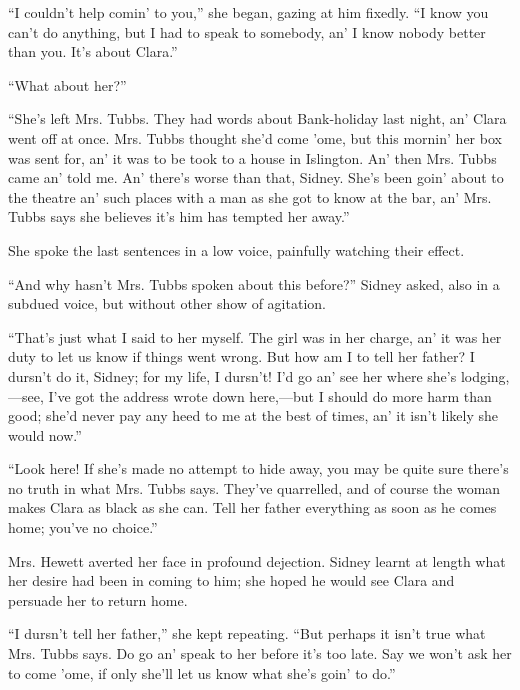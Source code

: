 ``I couldn't help comin' to you,'' she began, gazing at him fixedly. ``I
know you can't do anything, but I had to speak to somebody,
{\protect\hypertarget{220}{}{}}an' I know nobody better than you. It's
about Clara.''

``What about her?''

``She's left Mrs. Tubbs. They had words about Bank-holiday last night,
an' Clara went off at once. Mrs. Tubbs thought she'd come 'ome, but this
mornin' her box was sent for, an' it was to be took to a house in
Islington. An' then Mrs. Tubbs came an' told me. An' there's worse than
that, Sidney. She's been goin' about to the theatre an' such places with
a man as she got to know at the bar, an' Mrs. Tubbs says she believes
it's him has tempted her away.''

She spoke the last sentences in a low voice, painfully watching their
effect.

``And why hasn't Mrs. Tubbs spoken about this before?'' Sidney asked,
also in a subdued voice, but without other show of agitation.

``That's just what I said to her myself. The girl was in her charge, an'
it was her duty to let us know if things went wrong. But how am I to
tell her father? I dursn't do it, Sidney; for my life, I dursn't! I'd go
{\protect\hypertarget{221}{}{}}an' see her where she's lodging,---see,
I've got the address wrote down here,---but I should do more harm than
good; she'd never pay any heed to me at the best of times, an' it isn't
likely she would now.''

``Look here! If she's made no attempt to hide away, you may be quite
sure there's no truth in what Mrs. Tubbs says. They've quarrelled, and
of course the woman makes Clara as black as she can. Tell her father
everything as soon as he comes home; you've no choice.''

Mrs. Hewett averted her face in profound dejection. Sidney learnt at
length what her desire had been in coming to him; she hoped he would see
Clara and persuade her to return home.

``I dursn't tell her father,'' she kept repeating. ``But perhaps it
isn't true what Mrs. Tubbs says. Do go an' speak to her before it's too
late. Say we won't ask her to come 'ome, if only she'll let us know what
she's goin' to do.''

